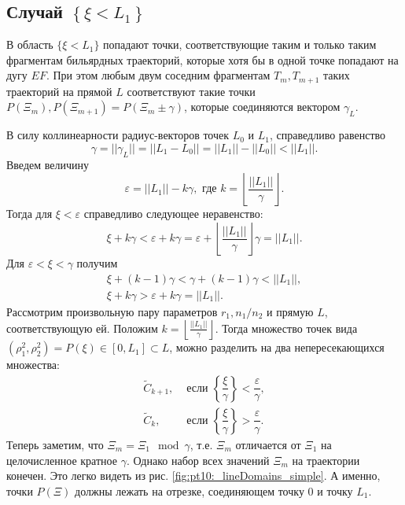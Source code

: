 
\subsection{Случай $\left\{\xi < L_1\right\}$}\label{s3.3}

В область $\{ \xi < L_1\}$ попадают точки, соответствующие таким и только таким фрагментам бильярдных траекторий, которые хотя бы в одной точке попадают на дугу $EF$. 
При этом любым двум соседним фрагментам $T_m, T_{m+1}$ таких траекторий на прямой $L$ соответствуют такие точки $P(\Xi_m), P(\Xi_{m+1}) = P(\Xi_m \pm \gamma)$, которые соединяются вектором $\gamma_L$.

В силу коллинеарности радиус-векторов точек $L_0$ и $L_1$,  справедливо равенство 
$$\gamma = ||\gamma_L|| = ||L_1-L_0|| = ||L_1||-||L_0|| < ||L_1||.$$
Введем величину 
\begin{equation}
\varepsilon = ||L_1||  - k \gamma, \text{ где } k=\left \lfloor \frac{||L_1||}{\gamma} \right \rfloor.
\label{eq:kDef}
\end{equation}
Тогда для $\xi < \varepsilon$ справедливо следующее неравенство:
$$\xi + k \gamma < \varepsilon + k \gamma =
 \varepsilon + \left \lfloor \frac{||L_1||}{\gamma} \right \rfloor \gamma = ||L_1||.$$
Для $\varepsilon< \xi <\gamma$ получим
\[
\begin{array}{cc}
\xi + (k-1) \gamma  < \gamma + (k-1) \gamma < ||L_1||, \\
\xi + k \gamma  > \varepsilon + k \gamma =  ||L_1||.
\end{array}
\] 
Рассмотрим произвольную пару параметров $r_1, n_1/n_2$ и прямую $L$, соответствующую ей. Положим $k=\left \lfloor \frac{||L_1||}{\gamma} \right \rfloor$. Тогда множество точек вида $(\rho_1^2, \rho_2^2) = P(\xi) \in [0, L_1] \subset L$, можно разделить на два непересекающихся множества:
\begin{equation*}
\begin{array}{ll}
    \widetilde{C}_{k+1}, & \text{ если } \left\{\dfrac{\xi}{\gamma}\right\} < \dfrac{\varepsilon}{\gamma}, \\
    \widetilde{C}_k, & \text{ если } \left\{\dfrac{\xi}{\gamma}\right\} > \dfrac{\varepsilon}{\gamma}.
\end{array}
\end{equation*} 
Теперь заметим, что $\Xi_m = \Xi_1 \mod \gamma$,
т.е. $\Xi_m$ отличается от $\Xi_1$ на целочисленное кратное $\gamma$. Однако набор всех значений $\Xi_m$ на траектории конечен. Это легко видеть из рис.     \ref{fig:pt10:_lineDomains_simple}. А именно, точки $P(\Xi)$ должны лежать на отрезке, соединяющем точку $0$ и точку $L_1$.

